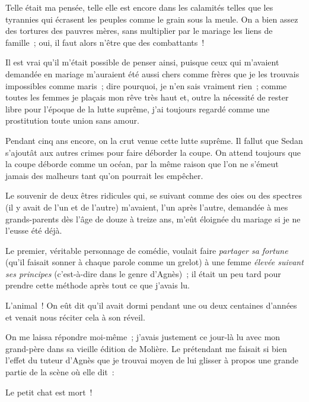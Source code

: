 \documentclass[french,twoside]{book} %
\begin{document}
\noindent Telle était ma pensée, telle elle est encore dans les calamités telles que les tyrannies qui écrasent les peuples comme le grain sous la meule. On a bien assez des tortures des pauvres mères, sans multiplier par le mariage les liens de famille ; oui, il faut alors n’être que des combattants !\par
Il est vrai qu’il m’était possible de penser ainsi, puisque ceux qui m’avaient demandée en mariage m’auraient été aussi chers comme frères que je les trouvais impossibles comme maris ; dire pourquoi, je n’en sais vraiment rien ; comme toutes les femmes je plaçais mon rêve très haut et, outre la nécessité de rester libre pour l’époque de la lutte suprême, j’ai toujours regardé comme une prostitution toute union sans amour.\par
Pendant cinq ans encore, on la crut venue cette lutte suprême. Il fallut que Sedan s’ajoutât aux autres crimes pour faire déborder la coupe. On attend toujours que la coupe déborde comme un océan, par la même raison que l’on ne s’émeut jamais des malheurs tant qu’on pourrait les empêcher.\par
 Le souvenir de deux êtres ridicules qui, se suivant comme des oies ou des spectres (il y avait de l’un et de l’autre) m’avaient, l’un après l’autre, demandée à mes grands-parents dès l’âge de douze à treize ans, m’eût éloignée du mariage si je ne l’eusse été déjà.\par
Le premier, véritable personnage de comédie, voulait faire \emph{partager sa fortune} (qu’il faisait sonner à chaque parole comme un grelot) à une femme \emph{élevée suivant ses principes} (c’est-à-dire dans le genre d’Agnès) ; il était un peu tard pour prendre cette méthode après tout ce que j’avais lu.\par
L’animal ! On eût dit qu’il avait dormi pendant une ou deux centaines d’années et venait nous réciter cela à son réveil.\par
On me laissa répondre moi-même ; j’avais justement ce jour-là lu avec mon grand-père dans sa vieille édition de Molière. Le prétendant me faisait si bien l’effet du tuteur d’Agnès que je trouvai moyen de lui glisser à propos une grande partie de la scène où elle dit :\par

Le petit chat est mort !\\
\end{document}
